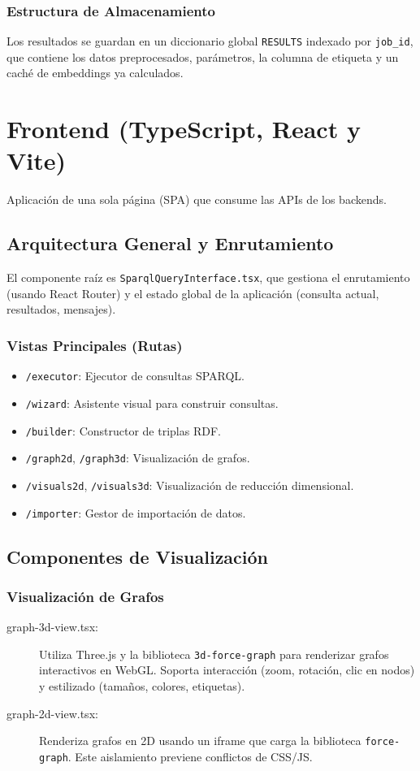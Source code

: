 \documentclass{article}
\begin{document}
\subsubsection{Estructura de Almacenamiento}
Los resultados se guardan en un diccionario global \texttt{RESULTS} indexado por \texttt{job\_id}, que contiene los datos preprocesados, parámetros, la columna de etiqueta y un caché de embeddings ya calculados.

\section{Frontend (TypeScript, React y Vite)}
Aplicación de una sola página (SPA) que consume las APIs de los backends.

\subsection{Arquitectura General y Enrutamiento}
El componente raíz es \texttt{SparqlQueryInterface.tsx}, que gestiona el enrutamiento (usando React Router) y el estado global de la aplicación (consulta actual, resultados, mensajes).

\subsubsection{Vistas Principales (Rutas)}
\begin{itemize}
    \item \texttt{/executor}: Ejecutor de consultas SPARQL.
    \item \texttt{/wizard}: Asistente visual para construir consultas.
    \item \texttt{/builder}: Constructor de triplas RDF.
    \item \texttt{/graph2d}, \texttt{/graph3d}: Visualización de grafos.
    \item \texttt{/visuals2d}, \texttt{/visuals3d}: Visualización de reducción dimensional.
    \item \texttt{/importer}: Gestor de importación de datos.
\end{itemize}

\subsection{Componentes de Visualización}

\subsubsection{Visualización de Grafos}
\begin{description}
    \item[graph-3d-view.tsx:] Utiliza Three.js y la biblioteca \texttt{3d-force-graph} para renderizar grafos interactivos en WebGL. Soporta interacción (zoom, rotación, clic en nodos) y estilizado (tamaños, colores, etiquetas).
    \item[graph-2d-view.tsx:] Renderiza grafos en 2D usando un iframe que carga la biblioteca \texttt{force-graph}. Este aislamiento previene conflictos de CSS/JS.
\end{description}
\end{document}

